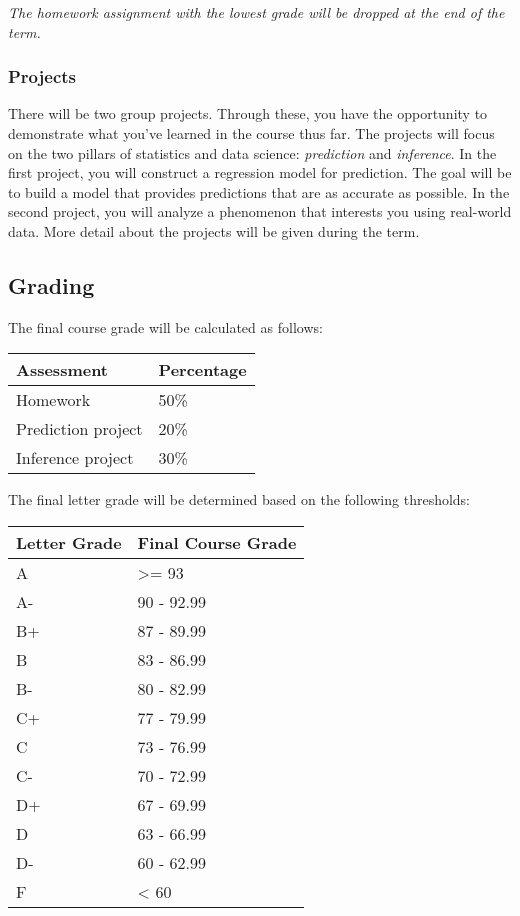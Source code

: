 \documentclass[
  letterpaper,
  DIV=11,
  numbers=noendperiod]{scrartcl}
\begin{document}
\emph{The homework assignment with the lowest grade will be dropped at
the end of the term.}

\hypertarget{projects}{%
\subsubsection{Projects}\label{projects}}

There will be two group projects. Through these, you have the
opportunity to demonstrate what you've learned in the course thus far.
The projects will focus on the two pillars of statistics and data
science: \emph{prediction} and \emph{inference}. In the first project,
you will construct a regression model for prediction. The goal will be
to build a model that provides predictions that are as accurate as
possible. In the second project, you will analyze a phenomenon that
interests you using real-world data. More detail about the projects will
be given during the term.

\hypertarget{grading}{%
\subsection{Grading}\label{grading}}

The final course grade will be calculated as follows:

\begin{longtable}[]{@{}ll@{}}
\toprule
Assessment & Percentage \\
\midrule
\endhead
Homework & 50\% \\
Prediction project & 20\% \\
Inference project & 30\% \\
\bottomrule
\end{longtable}

The final letter grade will be determined based on the following
thresholds:

\begin{longtable}[]{@{}ll@{}}
\toprule
Letter Grade & Final Course Grade \\
\midrule
\endhead
A & \textgreater= 93 \\
A- & 90 - 92.99 \\
B+ & 87 - 89.99 \\
B & 83 - 86.99 \\
B- & 80 - 82.99 \\
C+ & 77 - 79.99 \\
C & 73 - 76.99 \\
C- & 70 - 72.99 \\
D+ & 67 - 69.99 \\
D & 63 - 66.99 \\
D- & 60 - 62.99 \\
F & \textless{} 60 \\
\bottomrule
\end{longtable}
\end{document}
